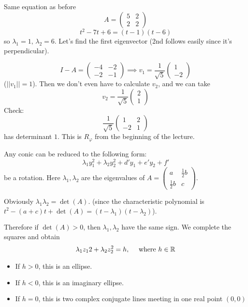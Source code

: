 \documentclass[10pt]{scrartcl}
\begin{document}
\begin{example} Same equation as before
\[
  A = \begin{pmatrix}
 5 & 2 \\ 2 & 2	
 \end{pmatrix}
\]
\[
  t^2 - 7t + 6 = (t-1)(t-6)
\]
so $\lambda_1 = 1,\, \lambda_2 = 6$. Let's find the first eigenvector (2nd follows easily since it's perpendicular). 

\[
  I - A = \begin{pmatrix}
 -4 & -2 \\ -2 & -1 	
 \end{pmatrix}\implies 
 v_1 = \frac{1}{\sqrt{5}}\begin{pmatrix}
1 \\ -2	
\end{pmatrix}
\]
($||v_1|| = 1$). Then we don't even have to calculate $v_2$, and we can take 
\[
  v_2 = \frac{1}{\sqrt{5}}\begin{pmatrix}
 2 \\ 1	
\end{pmatrix}
\]
Check: 
\[
  \frac{1}{\sqrt{5}}\begin{pmatrix}
 1 & 2 \\ -2 & 1	
\end{pmatrix}
\]
has determinant $1$. This is $R_\varphi$ from the beginning of the lecture.
\end{example}\vsp



\begin{corollary}
Any conic can be reduced to the following form:
\[
  \lambda_1y_1^2 + \lambda_2y_2^2 + d'y_1 + e'y_2 + f' 
\]
be a rotation. Here $\lambda_1,\lambda_2$ are the eigenvalues of $A = \begin{pmatrix}
 a & \frac{1}{2}b\\ \frac{1}{2}b & c	
 \end{pmatrix}$. 
\end{corollary}\vsp


Obviously $\lambda_1\lambda_2 = \det(A)$. (since the characteristic polynomial is $t^2 - (a+c)t + \det(A) = (t-\lambda_1)(t-\lambda_2)$).

Therefore if $\det(A) > 0$, then $\lambda_1,\lambda_2$ have the same sign. We complete the squares and obtain
\[
  \lambda_1z_12 + \lambda_2z_2^2 = h,\quad \mbox{ where $h \in\mathbb{R}$}
\]
\begin{itemize}
\item  If $h > 0$, this is an ellipse. 
\item If $h < 0$, this is an imaginary ellipse.
\item If $h = 0$, this is two complex conjugate lines meeting in one real point $(0,0)$
\end{itemize}\vsp
\end{document}
